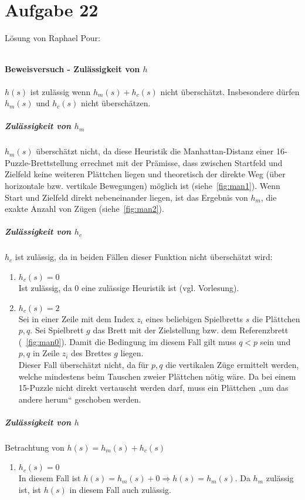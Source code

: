 \documentclass{scrreprt}
\begin{document}
\section{Aufgabe 22}
Lösung von Raphael Pour:
\begin{anumerate}
\item $ $
\paragraph{Beweisversuch - Zulässigkeit von $h$}
$h(s)$ ist zulässig wenn $h_m(s) + h_c(s)$ nicht überschätzt. Insbesondere dürfen $h_m(s)$ und $h_c(s)$ nicht überschätzen.
\subparagraph{Zulässigkeit von $h_m$}
$h_m(s)$ überschätzt nicht, da diese Heuristik die Manhattan-Distanz einer 16-Puzzle-Brettstellung errechnet mit der Prämisse, dass zwischen Startfeld und Zielfeld keine weiteren Plättchen liegen und theoretisch der direkte Weg (über horizontale bzw. vertikale Bewegungen) möglich ist (siehe~\autoref{fig:man1}). Wenn Start und Zielfeld direkt nebeneinander liegen, ist das Ergebnis von $h_m$, die exakte Anzahl von Zügen (siehe~\autoref{fig:man2}).
\subparagraph{Zulässigkeit von $h_c$}
$h_c$  ist zulässig, da in beiden Fällen dieser Funktion nicht überschätzt wird:
\begin{enumerate}[label=Fall \arabic*:]
    \item $h_c(s) = 0$\\
    Ist zulässig, da 0 eine zulässige Heuristik ist (vgl. Vorlesung).
    \item $h_c(s) = 2$\\
    Sei in einer Zeile mit dem Index $z_i$ eines beliebigen Spielbretts $s$ die  Plättchen $p,q$. Sei Spielbrett $g$ das Brett mit der Zielstellung bzw. dem Referenzbrett (~\ref{fig:man0}). Damit die Bedingung im diesem Fall gilt muss $q<p$ sein und $p,q$ in Zeile $z_i$ des Brettes $g$ liegen.\\
    Dieser Fall überschätzt nicht, da für $p,q$ die vertikalen Züge ermittelt werden, welche mindestens beim Tauschen zweier Plättchen nötig wäre. Da bei einem 15-Puzzle nicht direkt vertauscht werden darf, muss ein Plättchen „um das andere herum“ geschoben werden.
\end{enumerate}
\subparagraph{Zulässigkeit von $h$}
Betrachtung von $h(s) = h_m(s) + h_c(s)$
\begin{enumerate}[label=Fall \arabic*:]
    \item $h_c(s) = 0$\\
    In diesem Fall ist $h(s) = h_m(s) + 0 \Rightarrow h(s) = h_m(s) $. Da $h_m$ zulässig ist, ist $h(s)$ in diesem Fall auch zulässig.

\end{enumerate}
\end{anumerate}
\end{document}
